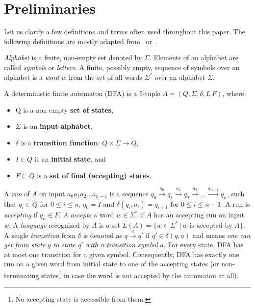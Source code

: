 \chapter{Preliminaries}

Let us clarify a few definitions and terms often used throughout this paper. The following definitions are mostly adapted from~\cite{Esparza} or~\cite{Sipser}.

\emph{Alphabet} is a finite, non-empty set denoted by $\Sigma$. Elements of an alphabet are called \emph{symbols} or \emph{letters}. A finite, possibly empty, sequence of symbols over an alphabet is a \emph{word} $w$ from the set of all words $\Sigma^*$ over an alphabet $\Sigma$.

\begin{definition} \hfill \newline
    A deterministic finite automaton (DFA) is a 5-tuple $A = (Q, \Sigma, \delta, I, F)$, where:
    \begin{itemize}
        \item Q is a non-empty \textbf{set of states},
        \item $\Sigma$ is an \textbf{input alphabet},
        \item $\delta$ is a \textbf{transition function}: $Q \times \Sigma \rightarrow{} Q$,
        \item $I \in Q$ is an \textbf{initial state}, and
        \item $F \subseteq Q$ is a \textbf{set of final (accepting) states}.
    \end{itemize}
\end{definition}

A \emph{run} of $A$ on input $a_0a_1a_2 \ldots a_{n-1}$ is a sequence $q_0 \xrightarrow{a_0} q_1 \xrightarrow{a_1} q_2 \xrightarrow{a_3} \ldots \xrightarrow{a_{n-1}} q_n$, such that $q_i \in Q$ for $0 \leq i \leq n$, $q_0 = I$ and $\delta(q_i, a_i) = q_{i+1}$ for $0 \leq i \leq n - 1$. A run is \emph{accepting} if $q_n \in F$. $A$ \emph{accepts} a word $w \in \Sigma^*$ if $A$ has an accepting run on input $w$. A \emph{language} recognized by $A$ is a set $L(A) = \{w \in \Sigma^* \,\vert\, w \text{ is accepted by } A\}$. A single \emph{transition} from $\delta$ is denoted as $q \xrightarrow{a} q'$ if $q' \in \delta(q, a)$ and means \textit{one can get from state $q$ to state $q'$ with a transition symbol $a$}. For every state, DFA has at most one transition for a given symbol. Consequently, DFA has exactly one run on a given word from initial state to one of the accepting states (or non-terminating states\footnote{No accepting state is accessible from them.} in case the word is not accepted by the automaton at all).

